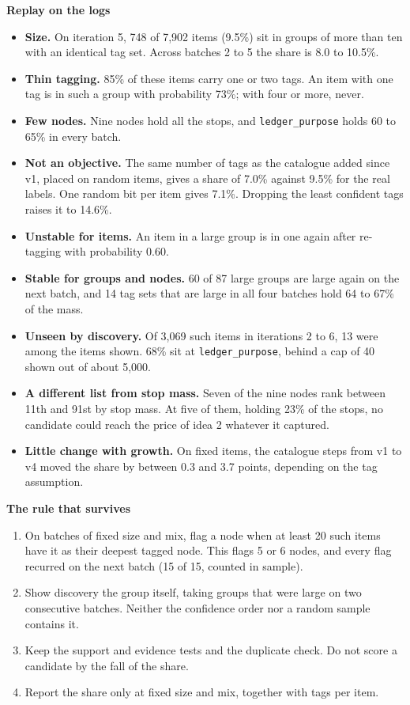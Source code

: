 \documentclass[10pt,a4paper]{article}
\newcommand{\code}[1]{\texttt{#1}}
\newcommand{\lab}[1]{\par\vspace{0.35em}\textbf{#1}\par\nobreak}
\begin{document}
\lab{Replay on the logs}
\begin{itemize}
\item \textbf{Size.} On iteration 5, 748 of 7,902 items (9.5\%) sit in groups of more than ten with an identical tag set. Across batches 2 to 5 the share is 8.0 to 10.5\%.
\item \textbf{Thin tagging.} 85\% of these items carry one or two tags. An item with one tag is in such a group with probability 73\%; with four or more, never.
\item \textbf{Few nodes.} Nine nodes hold all the stops, and \code{ledger\_purpose} holds 60 to 65\% in every batch.
\item \textbf{Not an objective.} The same number of tags as the catalogue added since v1, placed on random items, gives a share of 7.0\% against 9.5\% for the real labels. One random bit per item gives 7.1\%. Dropping the least confident tags raises it to 14.6\%.
\item \textbf{Unstable for items.} An item in a large group is in one again after re-tagging with probability 0.60.
\item \textbf{Stable for groups and nodes.} 60 of 87 large groups are large again on the next batch, and 14 tag sets that are large in all four batches hold 64 to 67\% of the mass.
\item \textbf{Unseen by discovery.} Of 3,069 such items in iterations 2 to 6, 13 were among the items shown. 68\% sit at \code{ledger\_purpose}, behind a cap of 40 shown out of about 5,000.
\item \textbf{A different list from stop mass.} Seven of the nine nodes rank between 11th and 91st by stop mass. At five of them, holding 23\% of the stops, no candidate could reach the price of idea 2 whatever it captured.
\item \textbf{Little change with growth.} On fixed items, the catalogue steps from v1 to v4 moved the share by between 0.3 and 3.7 points, depending on the tag assumption.
\end{itemize}

\lab{The rule that survives}
\begin{enumerate}
\item On batches of fixed size and mix, flag a node when at least 20 such items have it as their deepest tagged node. This flags 5 or 6 nodes, and every flag recurred on the next batch (15 of 15, counted in sample).
\item Show discovery the group itself, taking groups that were large on two consecutive batches. Neither the confidence order nor a random sample contains it.
\item Keep the support and evidence tests and the duplicate check. Do not score a candidate by the fall of the share.
\item Report the share only at fixed size and mix, together with tags per item.
\end{enumerate}
\end{document}
